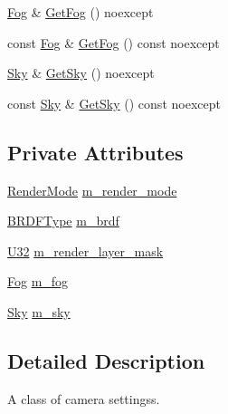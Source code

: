 \begin{DoxyCompactItemize}
\item 
\hyperlink{classmage_1_1rendering_1_1_fog}{Fog} \& \hyperlink{classmage_1_1rendering_1_1_camera_settings_a47b2b9eeca9d9eec61a7e290e1abfa43}{Get\+Fog} () noexcept
\item 
const \hyperlink{classmage_1_1rendering_1_1_fog}{Fog} \& \hyperlink{classmage_1_1rendering_1_1_camera_settings_acd360516b025b09c2ac668f48d6259c7}{Get\+Fog} () const noexcept
\item 
\hyperlink{classmage_1_1rendering_1_1_sky}{Sky} \& \hyperlink{classmage_1_1rendering_1_1_camera_settings_a3538572fc79fa03380cb9ed8cceeba42}{Get\+Sky} () noexcept
\item 
const \hyperlink{classmage_1_1rendering_1_1_sky}{Sky} \& \hyperlink{classmage_1_1rendering_1_1_camera_settings_a0045fb85eafcb33dff43c04656c4cc3b}{Get\+Sky} () const noexcept
\end{DoxyCompactItemize}
\subsection*{Private Attributes}
\begin{DoxyCompactItemize}
\item 
\hyperlink{namespacemage_1_1rendering_aeb14ce7610cc9391f4e01be027b91dcc}{Render\+Mode} \hyperlink{classmage_1_1rendering_1_1_camera_settings_adf563f8bd1ee5cecd126c6b4731de6e5}{m\+\_\+render\+\_\+mode}
\item 
\hyperlink{namespacemage_1_1rendering_a13c5e70586af4ce254146074ec055bf6}{B\+R\+D\+F\+Type} \hyperlink{classmage_1_1rendering_1_1_camera_settings_a763ee095ffc7143b9afdc7a6a658f2a8}{m\+\_\+brdf}
\item 
\hyperlink{namespacemage_a41c104c036fba3756a74e19f793eeaa1}{U32} \hyperlink{classmage_1_1rendering_1_1_camera_settings_ab6d4995fe7531563c5c5c8db1a0a1c9f}{m\+\_\+render\+\_\+layer\+\_\+mask}
\item 
\hyperlink{classmage_1_1rendering_1_1_fog}{Fog} \hyperlink{classmage_1_1rendering_1_1_camera_settings_a173329d1022c717efe29e33eaa554d18}{m\+\_\+fog}
\item 
\hyperlink{classmage_1_1rendering_1_1_sky}{Sky} \hyperlink{classmage_1_1rendering_1_1_camera_settings_a62c726791db2c8ee20ef404e15c5f26c}{m\+\_\+sky}
\end{DoxyCompactItemize}


\subsection{Detailed Description}
A class of camera settingss. 

